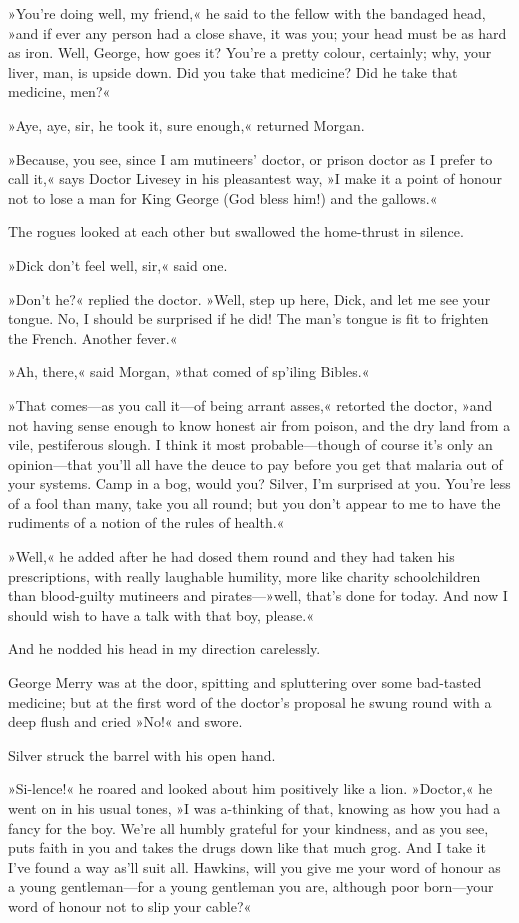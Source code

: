 »You're doing well, my friend,« he said to the fellow with the bandaged head, »and if ever any person had a close shave, it was you; your head must be as hard as iron. Well, George, how goes it? You're a pretty colour, certainly; why, your liver, man, is upside down. Did you take that medicine? Did he take that medicine, men?«

»Aye, aye, sir, he took it, sure enough,« returned Morgan.

»Because, you see, since I am mutineers' doctor, or prison doctor as I prefer to call it,« says Doctor Livesey in his pleasantest way, »I make it a point of honour not to lose a man for King George (God bless him!) and the gallows.«

The rogues looked at each other but swallowed the home-thrust in silence.

»Dick don't feel well, sir,« said one.

»Don't he?« replied the doctor. »Well, step up here, Dick, and let me see your tongue. No, I should be surprised if he did! The man's tongue is fit to frighten the French. Another fever.«

»Ah, there,« said Morgan, »that comed of sp'iling Bibles.«

»That comes—as you call it—of being arrant asses,« retorted the doctor, »and not having sense enough to know honest air from poison, and the dry land from a vile, pestiferous slough. I think it most probable—though of course it's only an opinion—that you'll all have the deuce to pay before you get that malaria out of your systems. Camp in a bog, would you? Silver, I'm surprised at you. You're less of a fool than many, take you all round; but you don't appear to me to have the rudiments of a notion of the rules of health.«

»Well,« he added after he had dosed them round and they had taken his prescriptions, with really laughable humility, more like charity schoolchildren than blood-guilty mutineers and pirates—»well, that's done for today. And now I should wish to have a talk with that boy, please.«

And he nodded his head in my direction carelessly.

George Merry was at the door, spitting and spluttering over some bad-tasted medicine; but at the first word of the doctor's proposal he swung round with a deep flush and cried »No!« and swore.

Silver struck the barrel with his open hand.

»Si-lence!« he roared and looked about him positively like a lion. »Doctor,« he went on in his usual tones, »I was a-thinking of that, knowing as how you had a fancy for the boy. We're all humbly grateful for your kindness, and as you see, puts faith in you and takes the drugs down like that much grog. And I take it I've found a way as'll suit all. Hawkins, will you give me your word of honour as a young gentleman—for a young gentleman you are, although poor born—your word of honour not to slip your cable?«

